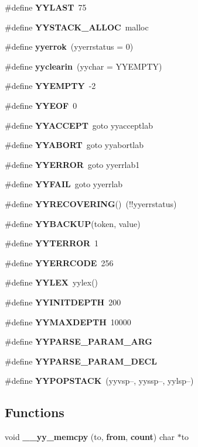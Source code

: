\begin{CompactItemize}
\item 
\#define {\bf YYLAST}\ 75
\item 
\#define {\bf YYSTACK\_\-ALLOC}\ malloc
\item 
\#define {\bf yyerrok}\ (yyerrstatus = 0)
\item 
\#define {\bf yyclearin}\ (yychar = YYEMPTY)
\item 
\#define {\bf YYEMPTY}\ -2
\item 
\#define {\bf YYEOF}\ 0
\item 
\#define {\bf YYACCEPT}\ goto yyacceptlab
\item 
\#define {\bf YYABORT}\ goto yyabortlab
\item 
\#define {\bf YYERROR}\ goto yyerrlab1
\item 
\#define {\bf YYFAIL}\ goto yyerrlab
\item 
\#define {\bf YYRECOVERING}()\ (!!yyerrstatus)
\item 
\#define {\bf YYBACKUP}(token, value)
\item 
\#define {\bf YYTERROR}\ 1
\item 
\#define {\bf YYERRCODE}\ 256
\item 
\#define {\bf YYLEX}\ yylex()
\item 
\#define {\bf YYINITDEPTH}\ 200
\item 
\#define {\bf YYMAXDEPTH}\ 10000
\item 
\#define {\bf YYPARSE\_\-PARAM\_\-ARG}
\item 
\#define {\bf YYPARSE\_\-PARAM\_\-DECL}
\item 
\#define {\bf YYPOPSTACK}\ (yyvsp--, yyssp--, yylsp--)
\end{CompactItemize}
\subsection*{Functions}
\begin{CompactItemize}
\item 
void {\bf \_\-\_\-yy\_\-memcpy} (to, {\bf from}, {\bf count}) char $\ast$to
\end{CompactItemize}
